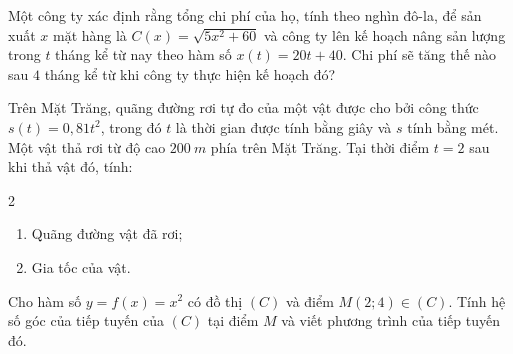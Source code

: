 \begin{vd}%
	Một công ty xác định rằng tổng chi phí của họ, tính theo nghìn đô-la, để sản xuất $x$ mặt hàng là $C(x)=\sqrt{5x^2+60}$ và công ty lên kế hoạch nâng sản lượng trong $t$ tháng kể từ nay theo hàm số $x(t)=20t+40$. Chi phí sẽ tăng thế nào sau $4$ tháng kể từ khi công ty thực hiện kế hoạch đó?
\end{vd}

\begin{vd}%
	Trên Mặt Trăng, quãng đường rơi tự đo của một vật được cho bởi công thức $s(t)=0,81t^2$, trong đó $t$ là thời gian được tính bằng giây và $s$ tính bằng mét. Một vật thả rơi từ độ cao $200~m$  phía trên Mặt Trăng. Tại thời điểm $t=2$ sau khi thả vật đó, tính:
	\begin{multicols}{2}
		\begin{enumerate}
			\item Quãng đường vật đã rơi;
			\item Gia tốc của vật.
		\end{enumerate}
	\end{multicols}	
\end{vd}

\begin{vd}%
	Cho hàm số $y=f(x)=x^2$ có đồ thị $(C)$ và điểm $M(2 ; 4) \in(C)$. Tính hệ số góc của tiếp tuyến của $(C)$ tại điểm $M$ và viết phương trình của tiếp tuyến đó.
\end{vd}

